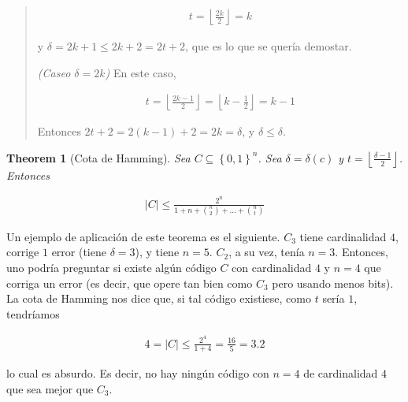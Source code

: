 \documentclass[a4paper]{article}
\newtheorem{theorem}{Theorem}
\newtheorem{theorem}{Theorem}
\begin{document}
\begin{quote}
    \begin{align*}
        t = \left\lfloor \frac{2k}{2} \right\rfloor = k
    \end{align*}

    y $\delta = 2k+1 \leq 2k+2 = 2t + 2$, que es lo que se quería demostar.

    \textit{(Caseo $\delta = 2k$)} En este caso, 

    \begin{align*}
        t = \left\lfloor \frac{2k-1}{2} \right\rfloor = \left\lfloor k - \frac{1}{2} \right\rfloor = k - 1
    \end{align*}

    Entonces $2t + 2 = 2(k-1) + 2 = 2k = \delta$, y $\delta \leq \delta$.

\end{quote}
\normalsize

\begin{theorem}[Cota de Hamming]
    Sea $C \subseteq \left\{ 0, 1 \right\}^n $. Sea $\delta = \delta(c)$ y $t =
    \left\lfloor \frac{\delta-1}{2} \right\rfloor$. Entonces 

    \begin{align*}
        |C| \leq \frac{2^n}{1 + n + \binom{n}{2} + \ldots  + \binom{n}{t}}
    \end{align*}
\end{theorem}

Un ejemplo de aplicación de este teorema es el siguiente. $C_3$ tiene
cardinalidad $4$, corrige $1$ error (tiene $\delta = 3$), y tiene $n = 5$.
$C_2$, a su vez, tenía $n = 3$. Entonces, uno podría preguntar si existe algún
código $C$ con cardinalidad $4$ y $n = 4$ que corriga un error (es decir, que opere tan
bien como $C_3$ pero usando menos bits). La cota de Hamming nos dice que, 
si tal código existiese, como $t$ sería $1$, tendríamos 

\begin{align*}
    4 = |C| \leq \frac{2^4}{1 + 4} = \frac{16}{5} = 3.2
\end{align*}

lo cual es absurdo. Es decir, no hay ningún código con $n = 4$ de cardinalidad
$4$ que sea mejor que $C_3$.
\end{document}

